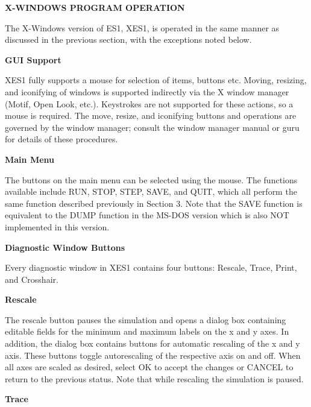 \newpage
\begin{section}
{\bf X-WINDOWS PROGRAM OPERATION}

The X-Windows version of ES1, XES1, is operated in the same manner as discussed
in the previous section, with the exceptions noted below.

\begin{subsection}
{\bf GUI Support}

   XES1 fully supports a mouse for selection of items, buttons etc.  Moving,
   resizing, and iconifying of windows is supported indirectly via the X window
   manager (Motif, Open Look, etc.).  Keystrokes are not supported for these
   actions, so a mouse is required.  The move, resize, and iconifying buttons
   and operations are governed by the window manager; consult the window
   manager manual or guru for details of these procedures.
\end {subsection}

\begin{subsection}
{\bf Main Menu}

   The buttons on the main menu can be selected using the mouse.  The functions
   available include RUN, STOP, STEP, SAVE, and QUIT, which all perform the
   same function described previously in Section 3.  Note that the SAVE
   function is equivalent to the DUMP function in the MS-DOS version which is
   also NOT implemented in this version.
\end{subsection}

\begin{subsection}
{\bf Diagnostic Window Buttons}

   Every diagnostic window in XES1 contains four buttons: Rescale, Trace,
   Print, and Crosshair.

\begin{subsubsection}
{\bf Rescale}

      The rescale button pauses the simulation and opens a dialog box
      containing editable fields for the minimum and maximum labels on the x
      and y axes.  In addition, the dialog box contains buttons for automatic
      rescaling of the x and y axis.  These buttons toggle autorescaling of the
      respective axis on and off.  When all axes are scaled as desired, select
      OK to accept the changes or CANCEL to return to the previous status.
      Note that while rescaling the simulation is paused.
\end{subsubsection}

\begin{subsubsection}
{\bf Trace}


\end{subsubsection}
\end{subsection}
\end{section}
